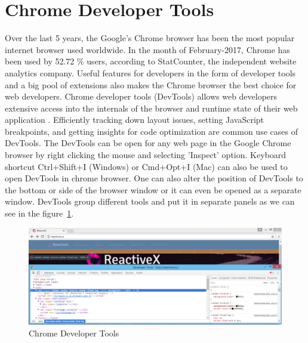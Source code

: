 \section{Chrome Developer Tools}
Over the last 5 years, the Google's Chrome browser has been the most popular internet browser used worldwide. In the month of February-2017, Chrome has been used by 52.72  \% users, according to StatCounter, the independent website analytics company. Useful features for developers in the form of developer tools and a big pool of extensions also makes the Chrome browser the best choice for web developers.  Chrome developer tools (DevTools) allows web developers extensive access into the internals of the browser and runtime state of their web application \cite{CDT}. Efficiently tracking down layout issues, setting JavaScript breakpoints, and getting insights for code optimization are common use cases of DevTools.
The DevTools can be open for any web page in the Google Chrome browser by right clicking the mouse and selecting 'Inspect' option. Keyboard shortcut Ctrl+Shift+I (Windows) or Cmd+Opt+I (Mac) can also be used to open DevTools in chrome browser.  One can also alter the position of DevTools to the bottom or side of the browser window or it can even be opened as a separate window. DevTools group different tools and put it in separate panels as we can see in the figure~\ref{fig:chrome_dev_tools}.
\begin{figure}[!h]
	\centering
	\includegraphics[scale=0.5,trim=0 0 0 0]{gfx/dev_tools.png}
	\caption{Chrome Developer Tools}
	\label{fig:chrome_dev_tools}
	
\end{figure} 

